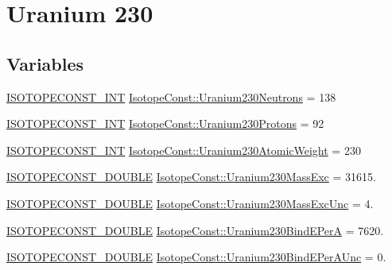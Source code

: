 \hypertarget{group___isotope_const-_uranium-_u230}{}\section{Uranium 230}
\label{group___isotope_const-_uranium-_u230}
\subsection*{Variables}
\begin{DoxyCompactItemize}
\item 
\mbox{\hyperlink{group___isotope_const-_macros_ga5f18360b3e99483a35c32d789e62621c}{I\+S\+O\+T\+O\+P\+E\+C\+O\+N\+S\+T\+\_\+\+I\+NT}} \mbox{\hyperlink{group___isotope_const-_uranium-_u230_ga43ed6f1a67e44dfe89bb88da084cf20e}{Isotope\+Const\+::\+Uranium230\+Neutrons}} = 138
\item 
\mbox{\hyperlink{group___isotope_const-_macros_ga5f18360b3e99483a35c32d789e62621c}{I\+S\+O\+T\+O\+P\+E\+C\+O\+N\+S\+T\+\_\+\+I\+NT}} \mbox{\hyperlink{group___isotope_const-_uranium-_u230_gace1b815d1f54e24be85eeb5922dfed4d}{Isotope\+Const\+::\+Uranium230\+Protons}} = 92
\item 
\mbox{\hyperlink{group___isotope_const-_macros_ga5f18360b3e99483a35c32d789e62621c}{I\+S\+O\+T\+O\+P\+E\+C\+O\+N\+S\+T\+\_\+\+I\+NT}} \mbox{\hyperlink{group___isotope_const-_uranium-_u230_ga36ad0feef52bc43bdc107ffeaa05346c}{Isotope\+Const\+::\+Uranium230\+Atomic\+Weight}} = 230
\item 
\mbox{\hyperlink{group___isotope_const-_macros_ga8f45a7272ce02c0b4c65c44636ed719a}{I\+S\+O\+T\+O\+P\+E\+C\+O\+N\+S\+T\+\_\+\+D\+O\+U\+B\+LE}} \mbox{\hyperlink{group___isotope_const-_uranium-_u230_gac11b4362f255939765c94887322bcbe8}{Isotope\+Const\+::\+Uranium230\+Mass\+Exc}} = 31615.
\item 
\mbox{\hyperlink{group___isotope_const-_macros_ga8f45a7272ce02c0b4c65c44636ed719a}{I\+S\+O\+T\+O\+P\+E\+C\+O\+N\+S\+T\+\_\+\+D\+O\+U\+B\+LE}} \mbox{\hyperlink{group___isotope_const-_uranium-_u230_gad090b31c8222ba57b41c0cf15005450e}{Isotope\+Const\+::\+Uranium230\+Mass\+Exc\+Unc}} = 4.
\item 
\mbox{\hyperlink{group___isotope_const-_macros_ga8f45a7272ce02c0b4c65c44636ed719a}{I\+S\+O\+T\+O\+P\+E\+C\+O\+N\+S\+T\+\_\+\+D\+O\+U\+B\+LE}} \mbox{\hyperlink{group___isotope_const-_uranium-_u230_gaafa72f826ce2adfb4dbad3701ead99e0}{Isotope\+Const\+::\+Uranium230\+Bind\+E\+PerA}} = 7620.
\item 
\mbox{\hyperlink{group___isotope_const-_macros_ga8f45a7272ce02c0b4c65c44636ed719a}{I\+S\+O\+T\+O\+P\+E\+C\+O\+N\+S\+T\+\_\+\+D\+O\+U\+B\+LE}} \mbox{\hyperlink{group___isotope_const-_uranium-_u230_gaa2ec47659c789e8e130456e125bc6722}{Isotope\+Const\+::\+Uranium230\+Bind\+E\+Per\+A\+Unc}} = 0.

\end{DoxyCompactItemize}
